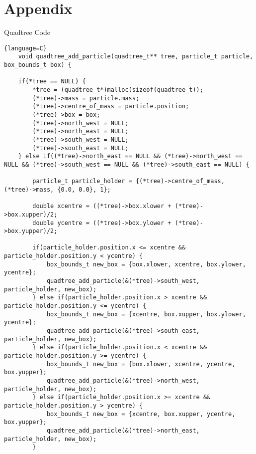 \section{Appendix}
\begin{center}
    Quadtree Code
\end{center}
\begin{lstlisting}{language=C}
    void quadtree_add_particle(quadtree_t** tree, particle_t particle, box_bounds_t box) {

    if(*tree == NULL) {
        *tree = (quadtree_t*)malloc(sizeof(quadtree_t));
        (*tree)->mass = particle.mass;
        (*tree)->centre_of_mass = particle.position;
        (*tree)->box = box;
        (*tree)->north_west = NULL;
        (*tree)->north_east = NULL;
        (*tree)->south_west = NULL;
        (*tree)->south_east = NULL;
    } else if((*tree)->north_east == NULL && (*tree)->north_west == NULL && (*tree)->south_west == NULL && (*tree)->south_east == NULL) {

        particle_t particle_holder = {(*tree)->centre_of_mass, (*tree)->mass, {0.0, 0.0}, 1};

        double xcentre = ((*tree)->box.xlower + (*tree)->box.xupper)/2;
        double ycentre = ((*tree)->box.ylower + (*tree)->box.yupper)/2;

        if(particle_holder.position.x <= xcentre && particle_holder.position.y < ycentre) {
            box_bounds_t new_box = {box.xlower, xcentre, box.ylower, ycentre};
            quadtree_add_particle(&(*tree)->south_west, particle_holder, new_box);
        } else if(particle_holder.position.x > xcentre && particle_holder.position.y <= ycentre) {
            box_bounds_t new_box = {xcentre, box.xupper, box.ylower, ycentre};
            quadtree_add_particle(&(*tree)->south_east, particle_holder, new_box);
        } else if(particle_holder.position.x < xcentre && particle_holder.position.y >= ycentre) {
            box_bounds_t new_box = {box.xlower, xcentre, ycentre, box.yupper};
            quadtree_add_particle(&(*tree)->north_west, particle_holder, new_box);
        } else if(particle_holder.position.x >= xcentre && particle_holder.position.y > ycentre) {
            box_bounds_t new_box = {xcentre, box.xupper, ycentre, box.yupper};
            quadtree_add_particle(&(*tree)->north_east, particle_holder, new_box);
        }


\end{lstlisting}
